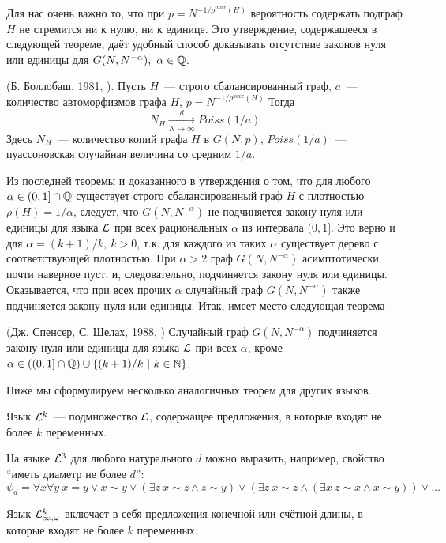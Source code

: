 Для нас очень важно то, что при $p = N^{-1/\rho^{max}(H)}$ вероятность содержать подграф $H$ не стремится ни к нулю, ни к единице.
Это утверждение, содержащееся в следующей теореме, даёт удобный способ доказывать отсутствие законов нуля или единицы для $G(N, N^{-\alpha}), ~\alpha \in \mathbb {Q}$.

\begin{theorem} (Б. Боллобаш, 1981, \cite{bollobas1981threshold}). Пусть $H$~--- строго сбалансированный граф, $a$~--- количество автоморфизмов графа $H$, $p = N^{-1/ \rho^{max}(H)}$
Тогда
\[N_H \xrightarrow[N\rightarrow \infty]{d} Poiss(1/a) \]
Здесь $N_H$~--- количество копий графа $H$ в $G(N, p)$, $Poiss(1/a)$~--- пуассоновская случайная величина со средним $1/a$.
\end{theorem}
Из последней теоремы и доказанного в \cite{rucinski1986strongly} утверждения о том, что для любого $\alpha \in (0,1] \cap \mathbb {Q}$ существует строго сбалансированный граф $H$ с плотностью $\rho(H) = 1/\alpha$, следует, что $G(N,N^{-\alpha})$ не подчиняется закону нуля или единицы для языка $\mathcal{L}$ при всех рациональных $\alpha$ из интервала $(0,1]$.
Это верно и для $\alpha = (k+1)/k,~ k > 0$, т.к. для каждого из таких $\alpha$ существует дерево с соответствующей плотностью.
При $\alpha > 2$ граф $G(N, N^{-\alpha})$ асимптотически почти наверное пуст, и, следовательно, подчиняется закону нуля или единицы.
Оказывается, что при всех прочих $\alpha$ случайный граф $G(N, N^{-\alpha})$ также подчиняется закону нуля или единицы.
Итак, имеет место следующая теорема
\begin{theorem} (Дж. Спенсер, С. Шелах, 1988, \cite{shelah1988zero})
Случайный граф $G(N, N^{-\alpha})$ подчиняется закону нуля или единицы для языка $\mathcal{L}$ при всех $\alpha$, кроме $\alpha \in \left((0,1] \cap \mathbb {Q} \right) \cup \{(k+1)/k ~|~ k \in \mathbb {N} \}$.
\end{theorem}

Ниже мы сформулируем несколько аналогичных теорем для других языков.

\Def Язык $\mathcal{L}^k$~--- подмножество $\mathcal{L}$, содержащее предложения, в которые входят не более $k$ переменных.

На языке $\mathcal{L}^3$ для любого натурального $d$ можно выразить, например, свойство ``иметь диаметр не более $d$'': 
\[
\psi_d = \forall x \forall y ~ x = y \vee x \sim y \vee \left( \exists z ~ x\sim z \wedge z \sim y \right)
\vee  \left( \exists z ~ x\sim z \wedge \left( \exists x ~ z \sim x \wedge x \sim y \right) \right) \vee \ldots
\]

\Def Язык $\mathcal{L}^k_{\infty, \omega}$ включает в себя предложения конечной или счётной длины, в которые входят не более $k$ переменных.

